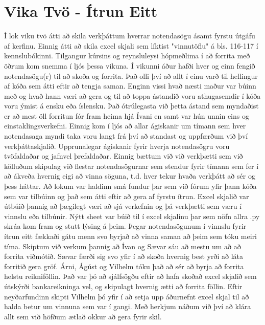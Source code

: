 \documentclass[a4paper,10pt]{article}
\begin{document}
\section{Vika Tvö - Ítrun Eitt}
Í lok viku tvö átti að skila verkþáttum hverrar notendasögu ásamt fyrstu útgáfu af kerfinu.  Einnig átti að skila excel skjali sem líktist "vinnutöflu" á bls. 116-117 í kennslubókinni.  Tilgangur kúrsins og reynsluleysi hópmeðlima í að forrita með öðrum kom snemma í ljós þessa vikuna.  Í vikunni áður hafði hver og einn fengið notendasögu(r) til að skoða og forrita.  Það olli því að allt í einu varð til hellingur af kóða sem átti eftir að tengja saman.  Enginn vissi hvað næsti maður var búinn með og hvað hann væri að gera og til að toppa ástandið voru athugasemdir í kóða voru ýmist á ensku eða íslensku.  Það ótrúlegasta við þetta ástand sem myndaðist er að mest öll forritun fór fram heima hjá Ívani en samt var hún unnin eins og einstaklingsverkefni.  Einnig kom í ljós að allar ágiskanir um tímann sem hver notendasaga myndi taka voru langt frá því að standast og uppfærðum við því verkþáttaskjalið.  Upprunalegar ágiskanir fyrir hverja notendasögru voru tvöfaldaðar og jafnvel þrefaldaðar.  Einnig bættum við við verkþætti sem við kölluðum skipulag við flestar notendasögurnar sem stendur fyrir tímann sem fer í að ákveða hvernig eigi að vinna söguna, t.d. hver tekur hvaða verkþátt að sér og þess háttar.
Að lokum var haldinn smá fundur þar sem við fórum yfir þann kóða sem var tilbúinn og það sem átti eftir að gera af fyrstu ítrun.  Excel skjalið var útbúið þannig að þægilegt væri að sjá verkefnin og þá verkþætti sem væru í vinnslu eða tilbúnir.  Nýtt sheet var búið til í excel skjalinu þar sem nöfn allra .py skráa kom fram og stutt lýsing á þeim.  Þegar notendasögunum í vinnslu fyrir ítrun eitt fækkaði gátu menn svo byrjað að vinna saman að þeim sem tóku meiri tíma.
Skiptum við verkum þannig að Ívan og Sævar sáu að mestu um að að forrita viðmótið.  Sævar færði sig svo yfir í að skoða hvernig best yrði að láta forritið gera gröf.  Árni, Ágúst og Vilhelm tóku það að sér að byrja að forrita helstu reikniföllin.  Það var þó að sjálfsögðu eftir að hafa skoðað excel skjalið sem útskýrði bankareikninga vel, og skipulagt hvernig ætti að forrita föllin.  Eftir neyðarfundinn skipti Vilhelm þó yfir í að setja upp áðurnefnt excel skjal til að halda betur um vinnuna sem var í gangi.  
Með herkjum náðum við því að klára allt sem við höfðum ætlað okkur að gera fyrir skil. 
\end{document}

